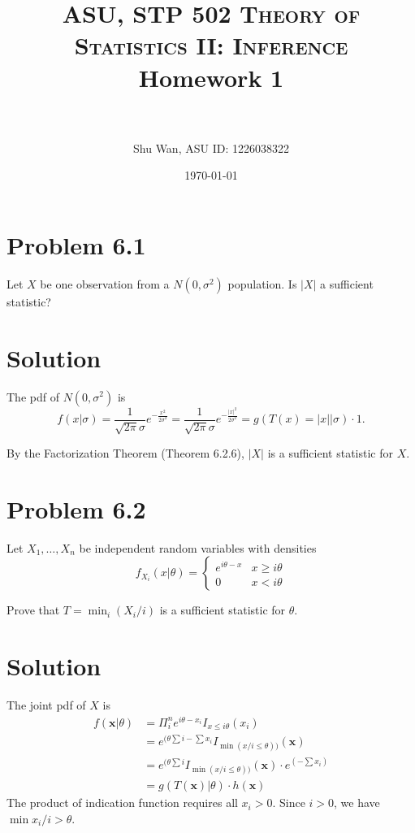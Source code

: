 \documentclass{article} %
\title{	
\normalfont \normalsize 
\textsc{ASU, STP 502 Theory of Statistics II: Inference} %
\horrule{0.5pt} \\[0.4cm] %
\huge Homework 1 \\ %
\horrule{2pt} \\[0.5cm] %
}
\author{Shu Wan, ASU ID: 1226038322} %
\date{\today} %
\newcommand{\sample}[1]{#1_1 , \dots , #1_n}
\newcommand{\solution}[1]{\section*{Solution #1}}
\begin{document}
\maketitle %

\section*{Problem 6.1}
Let $X$ be one observation from a $N(0, \sigma^2 )$ population. Is $|X|$ a sufficient statistic? \\

\solution{}

The pdf of $N(0, \sigma^2 )$ is $$f(x|\sigma) = \frac{1}{\sqrt{2\pi}\sigma}e^{-\frac{x^2}{2\sigma^2}} = \frac{1}{\sqrt{2\pi}\sigma}e^{-\frac{|x|^2}{2\sigma^2}} = g(T(x) = |x| | \sigma) \cdot 1.$$

By the Factorization Theorem (Theorem 6.2.6), $|X|$ is a sufficient statistic for $X$.

\section*{Problem 6.2}
Let $\sample{X}$ be independent random variables with densities \\
\begin{equation*}
  f_{X_i}(x|\theta) = \begin{cases}
  e^{i\theta - x}  & x  \ge i\theta \\
  0 & x  < i\theta
\end{cases}
\end{equation*}

Prove that $T = \min_i (X_i/i)$ is a sufficient statistic for $\theta$. \\

\solution{}

The joint pdf of $X$ is 
\begin{align*}
    f(\mathbf{x}|\theta) &= \Pi _i^n e^{i\theta - x_i}I_{x \le i\theta}(x_i) \\
    &= e^{(\theta\sum i - \sum x_i}I_{\min(x/i \le \theta))}(\mathbf{x}) \\
    &= e^{(\theta\sum i}I_{\min(x/i \le \theta))}(\mathbf{x}) \cdot  e^{(- \sum x_i)} \\
    &= g(T(\mathbf{x})|\theta) \cdot h(\mathbf{x})
\end{align*}
The product of indication function requires all $x_i > 0$. Since $i > 0$, we have $\min x_i/i > \theta$.
\end{document}
